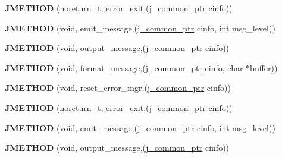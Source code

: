 \begin{DoxyCompactItemize}
\mbox{\label{structjpeg__error__mgr_a72c40bceda2e6cb78046165e6892ac3a}} 
{\bfseries J\+M\+E\+T\+H\+OD} (noreturn\+\_\+t, error\+\_\+exit,(\hyperlink{structjpeg__common__struct}{j\+\_\+common\+\_\+ptr} cinfo))
\item 
\mbox{\label{structjpeg__error__mgr_a73c0a027b6e6cb8ff2b7b0fc42f756f9}} 
{\bfseries J\+M\+E\+T\+H\+OD} (void, emit\+\_\+message,(\hyperlink{structjpeg__common__struct}{j\+\_\+common\+\_\+ptr} cinfo, int msg\+\_\+level))
\item 
\mbox{\label{structjpeg__error__mgr_ac2989f8ef34acdd78ce26a9110a1c094}} 
{\bfseries J\+M\+E\+T\+H\+OD} (void, output\+\_\+message,(\hyperlink{structjpeg__common__struct}{j\+\_\+common\+\_\+ptr} cinfo))
\item 
\mbox{\label{structjpeg__error__mgr_a5f1dfb51c337c36ae1bc5fae7f84528f}} 
{\bfseries J\+M\+E\+T\+H\+OD} (void, format\+\_\+message,(\hyperlink{structjpeg__common__struct}{j\+\_\+common\+\_\+ptr} cinfo, char $\ast$buffer))
\item 
\mbox{\label{structjpeg__error__mgr_ac676478083167b3731995d7901bd4b6c}} 
{\bfseries J\+M\+E\+T\+H\+OD} (void, reset\+\_\+error\+\_\+mgr,(\hyperlink{structjpeg__common__struct}{j\+\_\+common\+\_\+ptr} cinfo))
\item 
\mbox{\label{structjpeg__error__mgr_a72c40bceda2e6cb78046165e6892ac3a}} 
{\bfseries J\+M\+E\+T\+H\+OD} (noreturn\+\_\+t, error\+\_\+exit,(\hyperlink{structjpeg__common__struct}{j\+\_\+common\+\_\+ptr} cinfo))
\item 
\mbox{\label{structjpeg__error__mgr_a73c0a027b6e6cb8ff2b7b0fc42f756f9}} 
{\bfseries J\+M\+E\+T\+H\+OD} (void, emit\+\_\+message,(\hyperlink{structjpeg__common__struct}{j\+\_\+common\+\_\+ptr} cinfo, int msg\+\_\+level))
\item 
\mbox{\label{structjpeg__error__mgr_ac2989f8ef34acdd78ce26a9110a1c094}} 
{\bfseries J\+M\+E\+T\+H\+OD} (void, output\+\_\+message,(\hyperlink{structjpeg__common__struct}{j\+\_\+common\+\_\+ptr} cinfo))
\item 

\end{DoxyCompactItemize}
